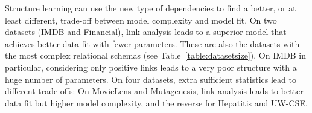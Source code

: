 \documentclass{acm_proc_article-sp}
\begin{document}
\begin{table}[htb]
\begin{center}
\end{center}
\caption{Comparison of Statistical Performance of Bayesian Network Learning.
}
\label{table:result_scores}
\end{table}




Structure learning can use the new type of dependencies to find a better, or at least different, trade-off between model complexity and model fit.
On two datasets (IMDB and Financial), link analysis leads to a superior model that achieves better data fit with fewer parameters. These are also the datasets with the most complex relational schemas (see Table~\ref{table:datasetsize}). On IMDB in particular, considering only positive links leads to a very poor structure with a huge number of parameters.
On four datasets, extra sufficient statistics lead to different trade-offs: On MovieLens and Mutagenesis, link analysis leads to better data fit but higher model complexity, and the reverse for Hepatitis and UW-CSE. 


\end{document}
